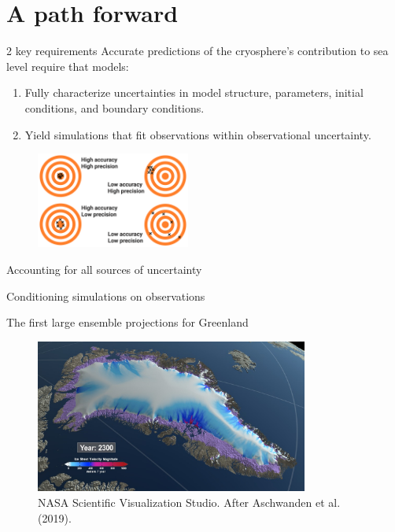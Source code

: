 \documentclass[hide notes,intlimits]{beamer}
\begin{document}
\part{A path forward}

\frame{\partpage}

  {
}

\begin{frame}{2 key requirements}
Accurate predictions of the cryosphere's contribution to sea level require that models:
\begin{enumerate}
    \item Fully characterize uncertainties in model structure, parameters, initial conditions, and boundary conditions.
    \item Yield simulations that fit observations within observational uncertainty. 
\end{enumerate}
  \begin{figure}
    \includegraphics[width=0.45\textwidth]{difference-accuracy-and-precision}
  \end{figure}
\end{frame}

\begin{frame}{Accounting for all sources of uncertainty}

\end{frame}

\begin{frame}{Conditioning simulations on observations}

\end{frame}


\begin{frame}{The first large ensemble projections for Greenland}
  \begin{figure}
    \includegraphics[width=0.8\textwidth]{Greenland_RCP_85_2008_2300_comp_4k.0293_print}
    \caption{NASA Scientific Visualization Studio. After Aschwanden et al. (2019).}
  \end{figure}
\end{frame}
\end{document}
